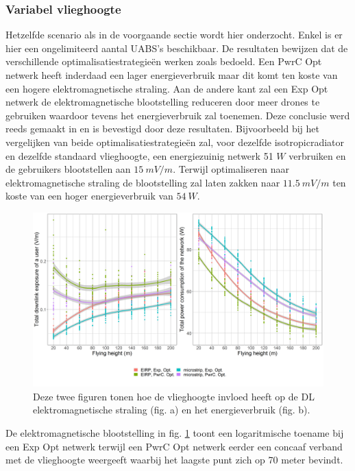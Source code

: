 \documentclass[twocolumn]{phdsymp_dutch}
\begin{document}
\subsubsection{Variabel vlieghoogte}
Hetzelfde scenario als in de voorgaande sectie wordt hier onderzocht. Enkel is er hier een ongelimiteerd aantal 
\gls{UABS}'s beschikbaar. De resultaten bewijzen dat de verschillende optimalisatiestrategie\"en werken zoals bedoeld.
Een \gls{PwrC Opt} netwerk heeft inderdaad een lager energieverbruik maar dit komt ten koste van een hogere elektromagnetische straling.
Aan de andere kant zal een  \gls{Exp Opt} netwerk de elektromagnetische blootstelling reduceren door meer drones te gebruiken waardoor tevens 
het energieverbruik zal toenemen. Deze conclusie werd reeds gemaakt in \cite{J1} en is bevestigd door deze resultaten.
Bijvoorbeeld bij het vergelijken van beide optimalisatiestrategieën zal, voor dezelfde
\gls{isotropicradiator} en dezelfde standaard vlieghoogte, een energiezuinig netwerk 51 $W$ verbruiken
en de gebruikers blootstellen aan $15\ mV/m$.
Terwijl optimaliseren naar elektromagnetische straling de blootstelling zal laten zakken naar 
$11.5\ mV/m$ ten koste van een hoger energieverbruik van $54\ W$.

\begin{figure}[h!]
  \includegraphics[width=\linewidth]{../results/s3/fhvsdlAndPc.png}
  \caption{Deze twee figuren tonen hoe de vlieghoogte invloed heeft op de \acs{DL} elektromagnetische straling (fig. a) en het energieverbruik (fig. b).}
  \label{fig:s3a_dlAndPc}
\end{figure}

De elektromagnetische blootstelling in fig. \ref{fig:s3a_dlAndPc} toont een logaritmische toename bij een 
\gls{Exp Opt} netwerk terwijl een \gls{PwrC Opt} netwerk eerder een concaaf verband met de vlieghoogte weergeeft 
waarbij het laagste punt zich op 70 meter bevindt.
\end{document}

